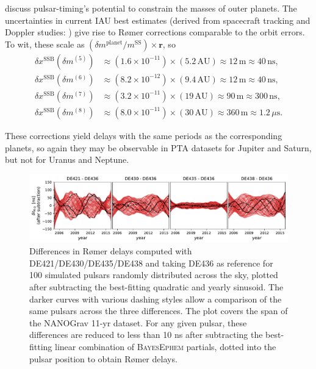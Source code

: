 \documentclass[iop,apj,twocolappendix]{emulateapj}
\begin{document}
\citet{2010ApJ...720L.201C} discuss pulsar-timing's potential to constrain the masses of outer planets. The uncertainties in current IAU best estimates (derived from spacecraft tracking and Doppler studies: \citealt{iaumasses,jh+2000,2006AJ....132.2520J,2014AJ....148...76J,2009AJ....137.4322J}) give rise to R{\o}mer corrections comparable to the orbit errors. To wit, these scale as $(\delta m^\mathrm{planet}/m^\mathrm{SS}) \times \mathbf{r}$, so
%
\begin{equation}
    \begin{aligned}
    \delta x^\mathrm{SSB}(\delta m^{(5)}) & \approx (1.6 \!\times\! 10^{-11})\!\times\!
    (5.2 \, \mathrm{AU})
    \approx 12 \, \mathrm{m} \approx 40 \, \mathrm{ns}, \\
    \delta x^\mathrm{SSB}(\delta m^{(6)}) & \approx (8.2 \!\times\! 10^{-12}) \!\times\!
    (9.4 \, \mathrm{AU})
    \approx 12 \, \mathrm{m} \approx 40 \, \mathrm{ns}, \\
    \delta x^\mathrm{SSB}(\delta m^{(7)}) & \approx (3.2 \!\times\! 10^{-11}) \!\times\!
    (19 \, \mathrm{AU})
    \approx 90 \, \mathrm{m} \approx 300 \, \mathrm{ns}, \\
    \delta x^\mathrm{SSB}(\delta m^{(8)}) & \approx (8.0 \!\times\! 10^{-11}) \!\times\!
    (30 \, \mathrm{AU})
    \approx 360 \, \mathrm{m} \approx 1.2 \, \mu\mathrm{s}.
    \end{aligned}
\end{equation}

These corrections yield delays with the same periods as the corresponding planets, so again they may be observable in PTA datasets for Jupiter and Saturn, but not for Uranus and Neptune.
%
\begin{figure}[t]
    \centering
    \includegraphics[width=2\columnwidth]{figures/roemerdiff.pdf}
    \caption{Differences in R{\o}mer delays computed with DE421/DE430/DE435/DE438 and taking DE436 as reference for 100 simulated pulsars randomly distributed across the sky, plotted after subtracting the best-fitting quadratic and yearly sinusoid. The darker curves with various dashing styles allow a comparison of the same pulsars across the three differences. The plot covers the span of the NANOGrav 11-yr dataset.
    For any given pulsar, these differences are reduced to less than 10 ns after subtracting the best-fitting linear combination of \textsc{BayesEphem} partials, dotted into the pulsar position to obtain R{\o}mer delays.
    }
    \label{fig:Roemer}
\end{figure}
\end{document}
